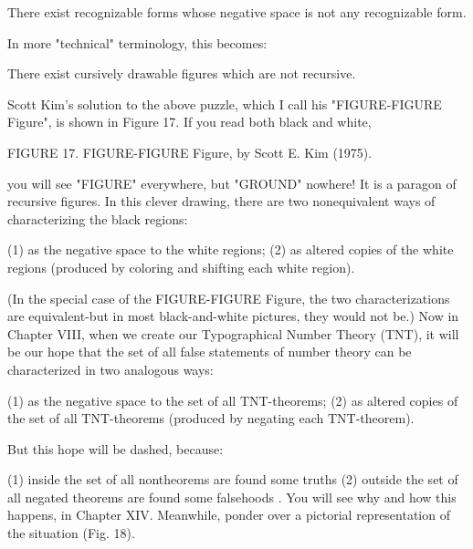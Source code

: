 There exist recognizable forms whose negative space is not any recognizable form. 

In more "technical" terminology, this becomes: 

There exist cursively drawable figures which are not recursive. 

Scott Kim's solution to the above puzzle, which I call his "FIGURE-FIGURE Figure", is shown in Figure 17. If you read both black and white, 







FIGURE 17. FIGURE-FIGURE Figure, by Scott E. Kim (1975). 







you will see "FIGURE" everywhere, but "GROUND" nowhere! It is a paragon of recursive figures. In this clever drawing, there are two nonequivalent ways of characterizing the black regions: 

(1) as the negative space to the white regions; (2) as altered copies of the white regions (produced by coloring and shifting each white region). 

(In the special case of the FIGURE-FIGURE Figure, the two characterizations are equivalent-but in most black-and-white pictures, they would not be.) Now in Chapter VIII, when we create our Typographical Number Theory (TNT), it will be our hope that the set of all false statements of number theory can be characterized in two analogous ways: 

(1) as the negative space to the set of all TNT-theorems; (2) as altered copies of the set of all TNT-theorems (produced by negating each TNT-theorem). 

But this hope will be dashed, because: 

(1) inside the set of all nontheorems are found some truths (2) outside the set of all negated theorems are found some falsehoods . You will see why and how this happens, in Chapter XIV. Meanwhile, ponder over a pictorial representation of the situation (Fig. 18). 

